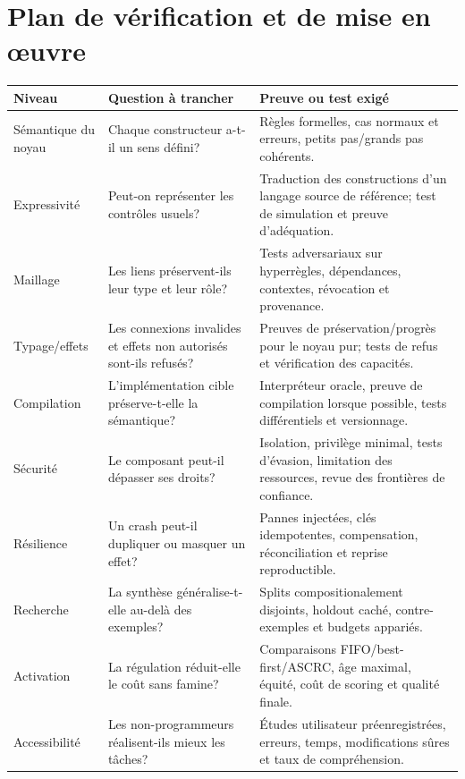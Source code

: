 \documentclass[11pt,a4paper]{article}
\begin{document}
\section{Plan de vérification et de mise en œuvre}
\begin{longtable}{p{}p{}p{}}
\toprule
\textbf{Niveau} & \textbf{Question à trancher} & \textbf{Preuve ou test exigé}\\
\midrule
Sémantique du noyau & Chaque constructeur a-t-il un sens défini? & Règles formelles, cas normaux et erreurs, petits pas/grands pas cohérents.\\
Expressivité & Peut-on représenter les contrôles usuels? & Traduction des constructions d'un langage source de référence; test de simulation et preuve d'adéquation.\\
Maillage & Les liens préservent-ils leur type et leur rôle? & Tests adversariaux sur hyperrègles, dépendances, contextes, révocation et provenance.\\
Typage/effets & Les connexions invalides et effets non autorisés sont-ils refusés? & Preuves de préservation/progrès pour le noyau pur; tests de refus et vérification des capacités.\\
Compilation & L'implémentation cible préserve-t-elle la sémantique? & Interpréteur oracle, preuve de compilation lorsque possible, tests différentiels et versionnage.\\
Sécurité & Le composant peut-il dépasser ses droits? & Isolation, privilège minimal, tests d'évasion, limitation des ressources, revue des frontières de confiance.\\
Résilience & Un crash peut-il dupliquer ou masquer un effet? & Pannes injectées, clés idempotentes, compensation, réconciliation et reprise reproductible.\\
Recherche & La synthèse généralise-t-elle au-delà des exemples? & Splits compositionalement disjoints, holdout caché, contre-exemples et budgets appariés.\\
Activation & La régulation réduit-elle le coût sans famine? & Comparaisons FIFO/best-first/ASCRC, âge maximal, équité, coût de scoring et qualité finale.\\
Accessibilité & Les non-programmeurs réalisent-ils mieux les tâches? & Études utilisateur préenregistrées, erreurs, temps, modifications sûres et taux de compréhension.\\
\bottomrule
\end{longtable}
\end{document}
